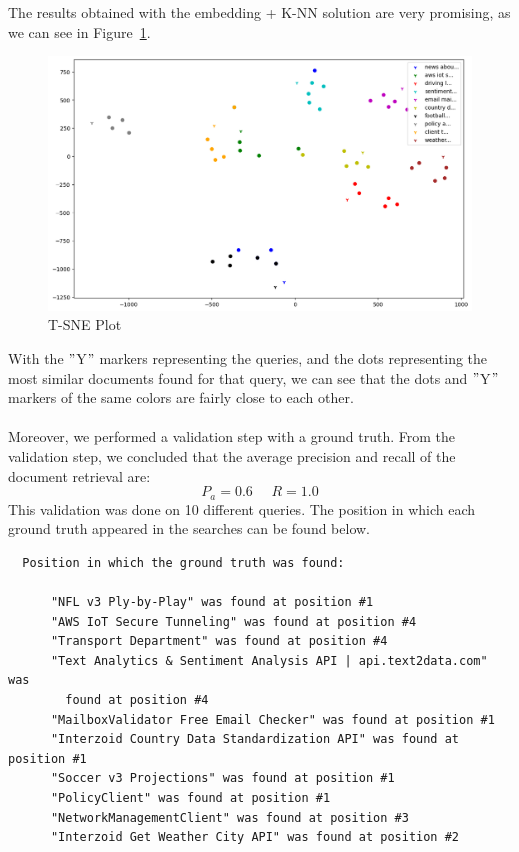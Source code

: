 The results obtained with the embedding + K-NN solution are very promising, as we can see in Figure~\ref{fig:tSNE-plot}.
\begin{figure}
    \centering
    \includegraphics[width=13cm]{../out/plots/SNE}
    \caption{T-SNE Plot}
    \label{fig:tSNE-plot}
\end{figure}
With the \("\)Y\("\) markers representing the queries, and the dots representing the most similar documents found for that query, we can see that the dots and \("\)Y\("\) markers of the same colors are fairly close to each other. \\ \\
Moreover, we performed a validation step with a ground truth.
From the validation step, we concluded that the average precision and recall of the document retrieval are:
\[P_a = 0.6 ~~~~~~ R = 1.0\]
This validation was done on 10 different queries.
The position in which each ground truth appeared in the searches can be found below.
\begin{verbatim}
  Position in which the ground truth was found:

      "NFL v3 Ply-by-Play" was found at position #1
      "AWS IoT Secure Tunneling" was found at position #4
      "Transport Department" was found at position #4
      "Text Analytics & Sentiment Analysis API | api.text2data.com" was
        found at position #4
      "MailboxValidator Free Email Checker" was found at position #1
      "Interzoid Country Data Standardization API" was found at position #1
      "Soccer v3 Projections" was found at position #1
      "PolicyClient" was found at position #1
      "NetworkManagementClient" was found at position #3
      "Interzoid Get Weather City API" was found at position #2
\end{verbatim}

